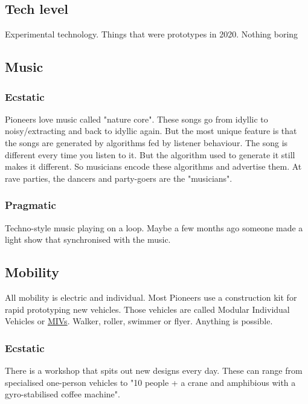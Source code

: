 \subsection{Tech level}

Experimental technology. Things that were prototypes in 2020. Nothing boring

\subsection{Music}

\subsubsection{Ecstatic}

Pioneers love music called "nature core". These songs go from idyllic to noisy/extracting and back to idyllic again. But the most unique feature is that the songs are generated by algorithms fed by listener behaviour.
The song is different every time you listen to it. But the algorithm used to generate it still makes it different. So musicians encode these algorithms and advertise them. At rave parties, the dancers and party-goers are the "musicians".

\subsubsection{Pragmatic}

Techno-style music playing on a loop. Maybe a few months ago someone made a light show that synchronised with the music.

\subsection{Mobility}

All mobility is electric and individual. Most Pioneers use a construction kit for rapid prototyping new vehicles. Those vehicles are called Modular Individual Vehicles or \hyperref[sec:MIV]{MIVs}. Walker, roller, swimmer or flyer. Anything is possible.

\subsubsection{Ecstatic}

There is a workshop that spits out new designs every day. These can range from specialised one-person vehicles to "10 people + a crane and amphibious with a gyro-stabilised coffee machine".


